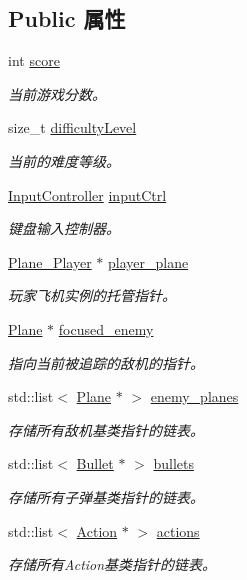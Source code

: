 \subsection*{Public 属性}
\begin{DoxyCompactItemize}
\item 
int \hyperlink{class_world_ae70b4ef5dd9cb9e7336169a25aaee39c}{score}
\begin{DoxyCompactList}\small\item\em 当前游戏分数。 \end{DoxyCompactList}\item 
size\+\_\+t \hyperlink{class_world_a594e81a86f319eea4e8e5a2029cdaa90}{difficulty\+Level}
\begin{DoxyCompactList}\small\item\em 当前的难度等级。 \end{DoxyCompactList}\item 
\hyperlink{class_input_controller}{Input\+Controller} \hyperlink{class_world_ae4cc86850d7092edbb7648d4cbd093aa}{input\+Ctrl}
\begin{DoxyCompactList}\small\item\em 键盘输入控制器。 \end{DoxyCompactList}\item 
\hyperlink{class_plane___player}{Plane\+\_\+\+Player} $\ast$ \hyperlink{class_world_ada7a87d1778bfc543635656ea8f12d3f}{player\+\_\+plane}
\begin{DoxyCompactList}\small\item\em 玩家飞机实例的托管指针。 \end{DoxyCompactList}\item 
\hyperlink{class_plane}{Plane} $\ast$ \hyperlink{class_world_ac8553c1be4fb1e79e94bf9f63f834963}{focused\+\_\+enemy}
\begin{DoxyCompactList}\small\item\em 指向当前被追踪的敌机的指针。 \end{DoxyCompactList}\item 
std\+::list$<$ \hyperlink{class_plane}{Plane} $\ast$ $>$ \hyperlink{class_world_a9692ac6798300e7fde98eb3ef1bb7c79}{enemy\+\_\+planes}
\begin{DoxyCompactList}\small\item\em 存储所有敌机基类指针的链表。 \end{DoxyCompactList}\item 
std\+::list$<$ \hyperlink{class_bullet}{Bullet} $\ast$ $>$ \hyperlink{class_world_a932c82c701ec6d13e2857943562954f2}{bullets}
\begin{DoxyCompactList}\small\item\em 存储所有子弹基类指针的链表。 \end{DoxyCompactList}\item 
std\+::list$<$ \hyperlink{class_action}{Action} $\ast$ $>$ \hyperlink{class_world_aefe8e0e9e418bbf81671314bf8d019f2}{actions}
\begin{DoxyCompactList}\small\item\em 存储所有\+Action基类指针的链表。 \end{DoxyCompactList}\end{DoxyCompactItemize}
